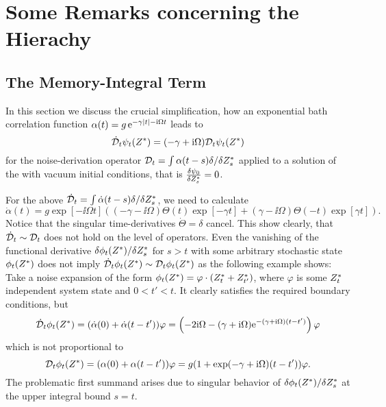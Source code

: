 \chapter{Some Remarks concerning the Hierachy}
\label{cha:hierarchy}

\section{The Memory-Integral Term}
\label{sec:hierarchy.memory_integral}

In this section we discuss the crucial simplification, how an exponential bath correlation function $\alpha(t) = g\,\exp[-\gamma\abs{t}-\ii\Omega t]$ leads to
\begin{equation}
  \dot\adjZZ_t\psitZ = (-\gamma + \ii\Omega) \adjZZ_t\psitZ
  \label{eq:memint.adjzzt_deriv}
\end{equation}
for the noise-derivation operator $\mathcal{D}_t = \int\alpha(t-s)\delta/\delta {Z}^*_s$ applied to a solution of the \NMSSE with vacuum initial conditions, that is $\frac{\delta\psi_0}{\delta {Z}^*_s} = 0$.

For the above $\dot{\mathcal{D}}_t = \int\dot\alpha(t-s)\delta/\delta {Z}^*_s$, we need to calculate
\begin{equation}
  \dot\alpha(t) = g \exp[-\ii \Omega t] \left( (-\gamma - \ii\Omega) \Theta(t) \exp[-\gamma t] + (\gamma - \ii\Omega)\Theta(-t)\exp[\gamma t] \right).
\end{equation}
Notice that the singular time-derivatives $\dot\Theta = \delta$ cancel.
This show clearly, that $\dot{\mathcal{D}}_t \sim \mathcal{D}_t$ does not hold on the level of operators.
Even the vanishing of the functional derivative $\delta \phi_t({Z}^*) / \delta {Z}^*_s$ for $s > t$ with some arbitrary stochastic state $\phi_t({Z}^*)$ does not imply $\dot{\mathcal{D}}_t \phi_t({Z}^*) \sim \mathcal{D}_t\phi_t({Z}^*)$ as the following example shows:
Take a noise expansion of the form $\phi_t({Z}^*) = \varphi \cdot ({Z}^*_t + {Z}^*_{t'})$, where $\varphi$ is some ${Z}^*_t$ independent system state and $0 < t' < t$.
It clearly satisfies the required boundary conditions, but
\begin{equation*}
  \dot\adjZZ_t \phi_t(\ZZ) = (\dot\alpha(0) + \dot\alpha(t-t')) \varphi = \left( -2\ii\Omega - (\gamma + \ii\Omega) \exp[-(\gamma + \ii\Omega) (t-t')] \right) \varphi
\end{equation*}
which is not proportional to
\begin{equation*}
  \adjZZ_t \phi_t(\ZZ) = (\alpha(0) + \alpha(t - t')) \varphi = g (1 + \exp(-\gamma + \ii \Omega)(t-t')) \varphi.
\end{equation*}
The problematic first summand arises due to singular behavior of $\delta \phi_t({Z}^*) / \delta {Z}^*_s$ at the upper integral bound $s = t$.

